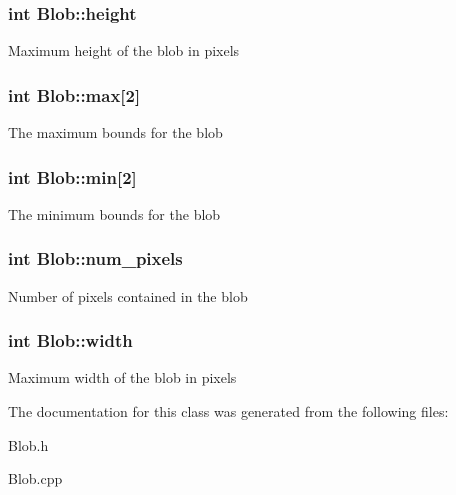\subsubsection[{\texorpdfstring{height}{height}}]{\setlength{\rightskip}{0pt plus 5cm}int Blob\+::height}\hypertarget{class_blob_a799f7528e23e76180b4267fb0588a929}{}\label{class_blob_a799f7528e23e76180b4267fb0588a929}
Maximum height of the blob in pixels 
\subsubsection[{\texorpdfstring{max}{max}}]{\setlength{\rightskip}{0pt plus 5cm}int Blob\+::max\mbox{[}2\mbox{]}}\hypertarget{class_blob_ac65f825c125a2d93eefae61b5602111d}{}\label{class_blob_ac65f825c125a2d93eefae61b5602111d}
The maximum bounds for the blob 
\subsubsection[{\texorpdfstring{min}{min}}]{\setlength{\rightskip}{0pt plus 5cm}int Blob\+::min\mbox{[}2\mbox{]}}\hypertarget{class_blob_a12342366f558050f8f19c0caaf83a49c}{}\label{class_blob_a12342366f558050f8f19c0caaf83a49c}
The minimum bounds for the blob 
\subsubsection[{\texorpdfstring{num\+\_\+pixels}{num_pixels}}]{\setlength{\rightskip}{0pt plus 5cm}int Blob\+::num\+\_\+pixels}\hypertarget{class_blob_a2970a2de48ad41c7ab03d7fad75d3250}{}\label{class_blob_a2970a2de48ad41c7ab03d7fad75d3250}
Number of pixels contained in the blob 
\subsubsection[{\texorpdfstring{width}{width}}]{\setlength{\rightskip}{0pt plus 5cm}int Blob\+::width}\hypertarget{class_blob_af83c73533a368f2244c982af843f922a}{}\label{class_blob_af83c73533a368f2244c982af843f922a}
Maximum width of the blob in pixels 

The documentation for this class was generated from the following files\+:\begin{DoxyCompactItemize}
\item 
Blob.\+h\item 
Blob.\+cpp\end{DoxyCompactItemize}
